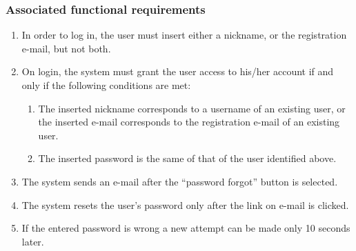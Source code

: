 \subsubsection{Associated functional requirements}
\begin{enumerate}
    \item In order to log in, the user must insert either a nickname, or the registration e-mail, but not both.
    \item On login, the system must grant the user access to his/her account if and only if the following conditions are met:
    \begin{enumerate}
    	\item The inserted nickname corresponds to a username of an existing user, or the inserted e-mail corresponds to the registration e-mail of an existing user.
	\item The inserted password is the same of that of the user identified above.
    \end{enumerate}
    \item The system sends an e-mail after the ``password forgot'' button is selected.
    \item The system resets the user's password only after the link on e-mail is clicked.
    \item If the entered password is wrong a new attempt can be made only 10 seconds later.

\end{enumerate}
